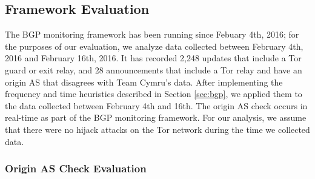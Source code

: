 

\subsection{Framework Evaluation}
The BGP monitoring framework has been running since Febuary 4th, 2016; for the purposes of our evaluation, we analyze data collected between February 4th, 2016 and February 16th, 2016.  It has recorded 2,248 updates that include a Tor guard or exit relay, and 28 announcements that include a Tor relay and have an origin AS that disagrees with Team Cymru's data.  After implementing the frequency and time heuristics described in Section \ref{sec:bgp}, we applied them to the data collected between February 4th and 16th.  The origin AS check occurs in real-time as part of the BGP monitoring framework.  For our analysis, we assume that there were no hijack attacks on the Tor network during the time we collected data.  

\subsubsection{Origin AS Check Evaluation}

